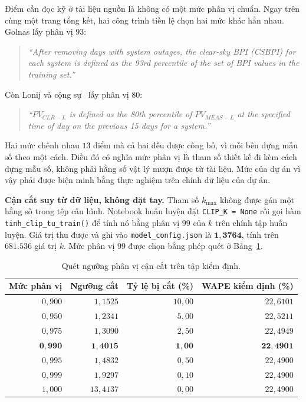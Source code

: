 \documentclass[12pt, a4paper]{report}
\begin{document}
Điểm cần đọc kỹ ở tài liệu nguồn là không có một mức phân vị chuẩn. Ngay trên cùng
một trang tổng kết, hai công trình tiền lệ chọn hai mức khác hẳn nhau. Golnas lấy
phân vị $93$:

\begin{quote}\small
\textit{``After removing days with system outages, the clear-sky BPI (CSBPI) for each system is defined as the 93rd percentile of the set of BPI values in the training set.''}
\end{quote}

Còn Lonij và cộng sự~\cite{lonij2012tucson} lấy phân vị $80$:

\begin{quote}\small
\textit{``$PV_{CLR-L}$ is defined as the 80th percentile of $PV_{MEAS-L}$ at the specified time of day on the previous 15 days for a system.''}
\end{quote}


Hai mức chênh nhau $13$ điểm mà cả hai đều được công bố, vì mỗi bên dựng mẫu số theo một cách.
Điều đó có nghĩa mức phân vị là tham số thiết kế đi kèm cách dựng mẫu số, không phải
hằng số vật lý mượn được từ tài liệu. Mức của dự án vì vậy phải được biện minh bằng thực
nghiệm trên chính dữ liệu của dự án.

\textbf{Cận cắt suy từ dữ liệu, không đặt tay.} Tham số $k_{\max}$ không được gán một hằng số
trong tệp cấu hình. Notebook huấn luyện đặt \texttt{CLIP\_K = None} rồi gọi hàm
\texttt{tinh\_clip\_tu\_train()} để tính nó bằng phân vị $99$ của $k$ trên chính tập huấn luyện.
Giá trị thu được và ghi vào \texttt{model\_config.json} là $\mathbf{1{,}3764}$, tính trên
$681.536$ giá trị $k$. Mức phân vị $99$ được chọn bằng phép quét ở
Bảng~\ref{tab:quet_phan_vi}.

\begin{table}[htbp]
\centering
\caption{Quét ngưỡng phân vị cận cắt trên tập kiểm định.}
\label{tab:quet_phan_vi}
\small
\begin{tabular}{r r r r}
\toprule
\textbf{Mức phân vị} & \textbf{Ngưỡng cắt} & \textbf{Tỷ lệ bị cắt (\%)} & \textbf{WAPE kiểm định (\%)} \\
\midrule
$0{,}900$ & $1{,}1525$ & $10{,}00$ & $22{,}6101$ \\
$0{,}950$ & $1{,}2341$ & $5{,}00$  & $22{,}5211$ \\
$0{,}975$ & $1{,}3090$ & $2{,}50$  & $22{,}4949$ \\
$\mathbf{0{,}990}$ & $\mathbf{1{,}4015}$ & $\mathbf{1{,}00}$ & $\mathbf{22{,}4901}$ \\
$0{,}995$ & $1{,}4832$ & $0{,}50$  & $22{,}4900$ \\
$0{,}999$ & $1{,}9297$ & $0{,}10$  & $22{,}4900$ \\
$1{,}000$ & $13{,}4137$ & $0{,}00$ & $22{,}4900$ \\
\bottomrule
\end{tabular}
\end{table}
\end{document}
